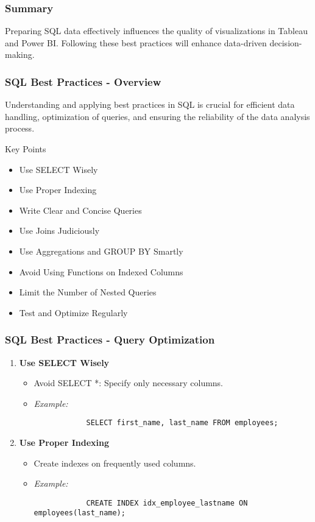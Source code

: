 \documentclass{beamer}
\begin{document}
\begin{frame}
    \frametitle{Summary}
    Preparing SQL data effectively influences the quality of visualizations in Tableau and Power BI. Following these best practices will enhance data-driven decision-making.
\end{frame}

\begin{frame}[fragile]
    \frametitle{SQL Best Practices - Overview}
    Understanding and applying best practices in SQL is crucial for efficient data handling, optimization of queries, and ensuring the reliability of the data analysis process.
    
    \begin{block}{Key Points}
        \begin{itemize}
            \item Use SELECT Wisely
            \item Use Proper Indexing
            \item Write Clear and Concise Queries
            \item Use Joins Judiciously
            \item Use Aggregations and GROUP BY Smartly
            \item Avoid Using Functions on Indexed Columns
            \item Limit the Number of Nested Queries
            \item Test and Optimize Regularly
        \end{itemize}
    \end{block}
\end{frame}

\begin{frame}[fragile]
    \frametitle{SQL Best Practices - Query Optimization}
    
    \begin{enumerate}
        \item \textbf{Use SELECT Wisely}
        \begin{itemize}
            \item Avoid SELECT *: Specify only necessary columns.
            \item \textit{Example:}
            \begin{lstlisting}
            SELECT first_name, last_name FROM employees;
            \end{lstlisting}
        \end{itemize}
        
        \item \textbf{Use Proper Indexing}
        \begin{itemize}
            \item Create indexes on frequently used columns.
            \item \textit{Example:}
            \begin{lstlisting}
            CREATE INDEX idx_employee_lastname ON employees(last_name);
            \end{lstlisting}
        \end{itemize}
    \end{enumerate}
\end{frame}
\end{document}
